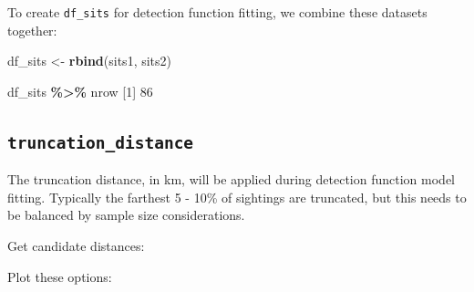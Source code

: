 \documentclass[
]{book}
\newenvironment{Shaded}{\begin{snugshade}}{\end{snugshade}}
\newcommand{\AttributeTok}[1]{\textcolor[rgb]{0.13,0.29,0.53}{#1}}
\newcommand{\DecValTok}[1]{\textcolor[rgb]{0.00,0.00,0.81}{#1}}
\newcommand{\FloatTok}[1]{\textcolor[rgb]{0.00,0.00,0.81}{#1}}
\newcommand{\FunctionTok}[1]{\textcolor[rgb]{0.13,0.29,0.53}{\textbf{#1}}}
\newcommand{\NormalTok}[1]{#1}
\newcommand{\OtherTok}[1]{\textcolor[rgb]{0.56,0.35,0.01}{#1}}
\newcommand{\SpecialCharTok}[1]{\textcolor[rgb]{0.81,0.36,0.00}{\textbf{#1}}}
\newcommand{\StringTok}[1]{\textcolor[rgb]{0.31,0.60,0.02}{#1}}
\begin{document}
To create \texttt{df\_sits} for detection function fitting, we combine these datasets together:

\begin{Shaded}
\begin{Highlighting}[]
\NormalTok{df\_sits }\OtherTok{\textless{}{-}} \FunctionTok{rbind}\NormalTok{(sits1, sits2)}

\NormalTok{df\_sits }\SpecialCharTok{\%\textgreater{}\%}\NormalTok{ nrow}
\NormalTok{[}\DecValTok{1}\NormalTok{] }\DecValTok{86}
\end{Highlighting}
\end{Shaded}

\hypertarget{truncation_distance}{%
\subsection*{\texorpdfstring{\texttt{truncation\_distance}}{truncation\_distance}}\label{truncation_distance}}

The truncation distance, in km, will be applied during detection function model fitting. Typically the farthest 5 - 10\% of sightings are truncated, but this needs to be balanced by sample size considerations.

Get candidate distances:

\begin{Shaded}
\end{Shaded}

Plot these options:

\begin{Shaded}
\end{Shaded}
\end{document}
